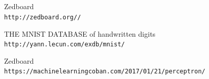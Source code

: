 \documentclass[12pt, a4paper, oneside]{article}
\begin{document}
        \subsection{}

    
    
	\begin{thebibliography}{9}
    	Zedboard
   		\\\texttt{http://zedboard.org//}
    		
	   	THE MNIST DATABASE of handwritten digits
	   	\\\texttt{http://yann.lecun.com/exdb/mnist/}
	   	
	   	Zedboard
	   	\\\texttt{https://machinelearningcoban.com/2017/01/21/perceptron/}
   \end{thebibliography}
	    
\end{document}

